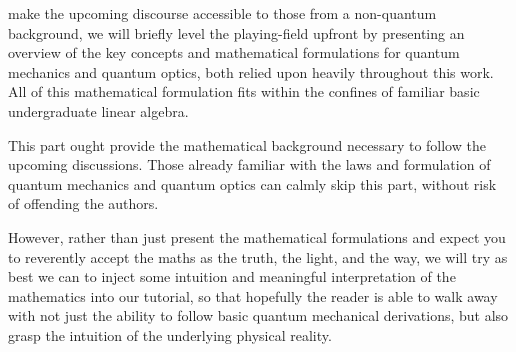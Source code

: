 \newline

 make the upcoming discourse accessible to those from a non-quantum background, we will briefly level the playing-field upfront by presenting an overview of the key concepts and mathematical formulations for quantum mechanics and quantum optics, both relied upon heavily throughout this work. All of this mathematical formulation fits within the confines of familiar basic undergraduate linear algebra.

This part ought provide the mathematical background necessary to follow the upcoming discussions. Those already familiar with the laws and formulation of quantum mechanics and quantum optics can calmly skip this part, without risk of offending the authors.

However, rather than just present the mathematical formulations and expect you to reverently accept the maths as the truth, the light, and the way, we will try as best we can to inject some intuition and meaningful interpretation of the mathematics into our tutorial, so that hopefully the reader is able to walk away with not just the ability to follow basic quantum mechanical derivations, but also grasp the intuition of the underlying physical reality.